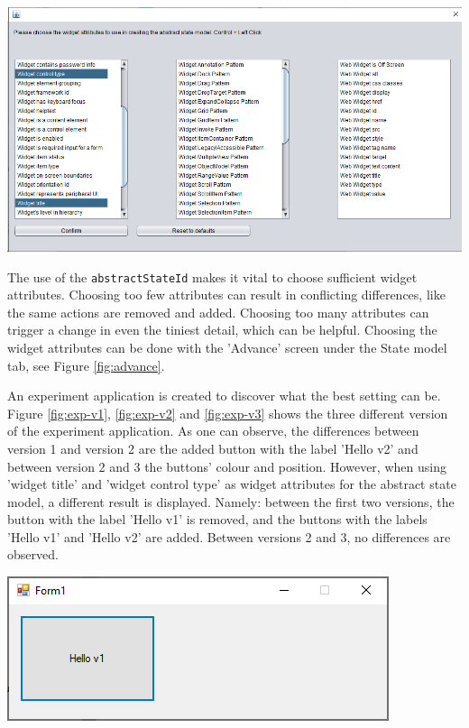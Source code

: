\begingroup
\captionsetup{type=figure}
\includegraphics[scale=0.5]{pics/attributes-state-model.png}
\label{fig:advance}
\endgroup



The use of the \verb|abstractStateId| makes it vital to choose sufficient widget attributes. Choosing too few attributes can result in conflicting differences, like the same actions are removed and added. Choosing too many attributes can trigger a change in even the tiniest detail, which can be helpful. Choosing the widget attributes can be done with the 'Advance' screen under the State model tab, see Figure \ref{fig:advance}.

An experiment application is created to discover what the best setting can be. Figure \ref{fig:exp-v1}, \ref{fig:exp-v2} and \ref{fig:exp-v3} shows the three different version of the experiment application. As one can observe, the differences between version 1 and version 2 are the added button with the label 'Hello v2' and between version 2 and 3 the buttons' colour and position. However, when using 'widget title' and 'widget control type' as widget attributes for the abstract state model, a different result is displayed. Namely: between the first two versions, the button with the label 'Hello v1' is removed, and the buttons with the labels 'Hello v1' and 'Hello v2' are added. Between versions 2 and 3, no differences are observed.

\begingroup
\captionsetup{type=figure}
\includegraphics[scale=1]{pics/exp-v1.png}
\label{fig:exp-v1}
\endgroup

